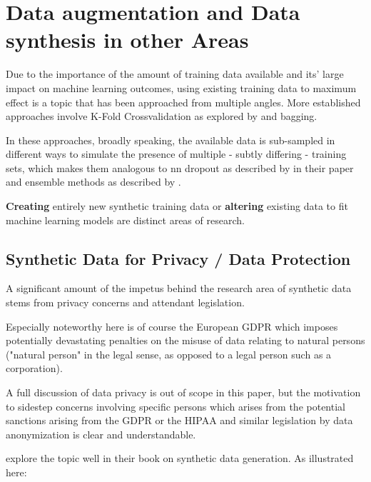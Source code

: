 \chapter{Data augmentation and Data synthesis in other Areas}
\label{chapter:synthetic_data}

Due to the importance of the amount of training data available and its' large impact on machine learning outcomes, using existing training data to maximum effect is a topic that has been approached from multiple angles. More established approaches involve K-Fold Crossvalidation as explored by \cite{kfold} and \ac{bagging}. 

In these approaches, broadly speaking, the available data is sub-sampled in different ways to simulate the presence of multiple - subtly differing - training sets, which makes them analogous to \ac{nn} dropout as described by \cite{srivastava2014dropout} in their paper and ensemble methods as described by \cite{dietterich2000ensemble}.

\textbf{Creating} entirely new synthetic training data or \textbf{altering} existing data to fit machine learning models are distinct areas of research. 

\pagebreak

\section{Synthetic Data for Privacy / Data Protection}

A significant amount of the impetus behind the research area of synthetic data stems from privacy concerns and attendant legislation.
 
Especially noteworthy here is of course the European \ac{GDPR} which imposes potentially devastating penalties on the misuse of data relating to natural persons ("natural person" in the legal sense, as opposed to a legal person such as a corporation). 

A full discussion of data privacy is out of scope in this paper, but the motivation to sidestep concerns involving specific persons which arises from the potential sanctions arising from the \ac{GDPR} or the \ac{HIPAA} and similar legislation by data anonymization is clear and understandable.

\cite{el2020practical} explore the topic well in their book on synthetic data generation. As illustrated here:


